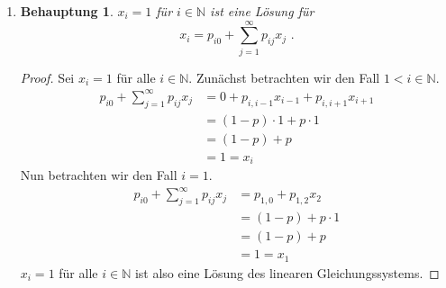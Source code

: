 \documentclass[a4paper]{scrartcl}
\newtheorem*{behaupt}{Behauptung}
\newcommand{\N}{\mathbb{N}}
\def \blattnr {3}
\begin{document}
\begin{enumerate}[label=\bfseries \blattnr.\arabic*]
\begin{enumerate}[label=\alph*)]
            \item
                \begin{behaupt}
                    $x_i = 1$ für $i \in \N$ ist eine Lösung für
                    \begin{equation*}
                        x_i = p_{i0} + \sum_{j=1}^\infty p_{ij} x_j
                        \text{ .}
                    \end{equation*}
                \end{behaupt}
                \begin{proof}
                    Sei $x_i = 1$ für alle $i \in \N$.
                    Zunächst betrachten wir den Fall $1 < i \in \N$.
                    \begin{equation*}
                        \begin{split}
                            p_{i0} + \sum_{j=1}^\infty p_{ij} x_j
                            &= 0 + p_{i,i-1} x_{i-1} + p_{i,i+1} x_{i+1} \\
                            &= (1-p) \cdot 1 + p \cdot 1 \\
                            &= (1-p) + p \\
                            &= 1 = x_i
                        \end{split}
                    \end{equation*}
                    Nun betrachten wir den Fall $i = 1$.
                    \begin{equation*}
                        \begin{split}
                            p_{i0} + \sum_{j=1}^\infty p_{ij} x_j
                            &= p_{1,0} + p_{1,2} x_{2} \\
                            &= (1-p)  + p \cdot 1 \\
                            &= (1-p) + p \\
                            &= 1 = x_1
                        \end{split}
                    \end{equation*}
                    $x_i = 1$ für alle $i \in \N$ ist also eine Lösung des
                    linearen Gleichungssystems.
                \end{proof}


\end{enumerate}
\end{enumerate}
\end{document}
